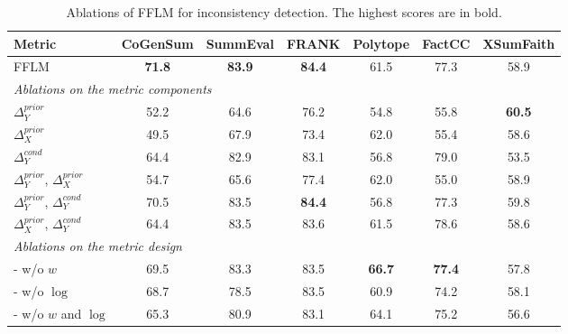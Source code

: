 \begin{table}[t]
	\scriptsize
	\centering
	\begin{tabular}{l|cccccc}
		\toprule[1pt]
		Metric & CoGenSum & SummEval & FRANK & Polytope & FactCC & XSumFaith \\
		\hline
		FFLM & \textbf{71.8} & \textbf{83.9} & \textbf{84.4} & 61.5 & 77.3 & {58.9} \\
		\hline
		\multicolumn{7}{l}{\textit{Ablations on the metric components }}\\
		$\Delta_Y^{prior}$ & 52.2 & 64.6 & 76.2 & 54.8 & 55.8 & \textbf{60.5} \\
		$\Delta_X^{prior}$ &49.5 & 67.9 & 73.4 & 62.0 & 55.4 & 58.6 \\
		
		$\Delta_Y^{cond}$ & 64.4 & 82.9 & 83.1 & 56.8 & 79.0 & 53.5\\
		
		$\Delta_Y^{prior}$, $\Delta_X^{prior}$&  54.7 & 65.6 & 77.4 & 62.0 & 55.0 & 58.9  \\
		$\Delta_Y^{prior}$, $\Delta_Y^{cond}$ & 70.5 & 83.5 & \textbf{84.4} & 56.8 & 77.3 & {59.8}\\
		$\Delta_X^{prior}$, $\Delta_Y^{cond}$ &  64.4 & 83.5 & 83.6 & 61.5 & 78.6 & 58.6 \\ 
		
		\hline
		\multicolumn{7}{l}{\textit{Ablations on the metric design}} \\
		- w/o $w$ & 69.5 & 83.3 & 83.5 & \textbf{66.7} & \textbf{77.4} & 57.8  \\
		- w/o $\log$ &68.7 & 78.5 & 83.5 & 60.9 & 74.2 & 58.1 \\
		- w/o $w$ and $\log$ & 65.3 & 80.9 & 83.1 & 64.1 & 75.2 & 56.6 \\
		
		
		\bottomrule[1pt]
	\end{tabular}
	\caption{Ablations of FFLM for inconsistency detection. The highest scores are in bold.} 
	\label{tab:ablation-id}
\end{table}



